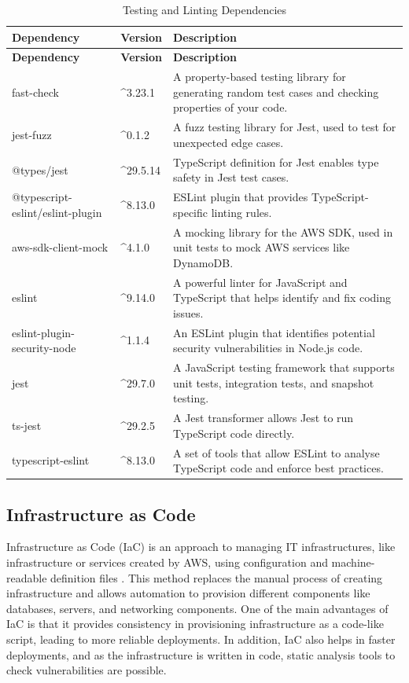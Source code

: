 \begin{longtable}{|l|l|p{8cm}|}
\caption{Testing and Linting Dependencies}
\label{table:lint_testing_dependencies}
\hline
\rowcolor{grey!15}
\textbf{Dependency} & \textbf{Version} & \textbf{Description} \\
\endfirsthead
\hline
\rowcolor{grey!15}
\textbf{Dependency} & \textbf{Version} & \textbf{Description} \\
\endhead
\endfoot
\hline
\endlastfoot
fast-check & \textasciicircum 3.23.1 & A property-based testing library for generating random test cases and checking properties of your code. \\
jest-fuzz & \textasciicircum 0.1.2 & A fuzz testing library for Jest, used to test for unexpected edge cases. \\
\hline
@types/jest & \textasciicircum 29.5.14 & TypeScript definition for Jest enables type safety in Jest test cases. \\
\hline
@typescript-eslint/eslint-plugin & \textasciicircum 8.13.0 & ESLint plugin that provides TypeScript-specific linting rules. \\
\hline
aws-sdk-client-mock & \textasciicircum 4.1.0 & A mocking library for the AWS SDK, used in unit tests to mock AWS services like DynamoDB. \\
\hline
eslint & \textasciicircum 9.14.0 & A powerful linter for JavaScript and TypeScript that helps identify and fix coding issues. \\
\hline
eslint-plugin-security-node & \textasciicircum 1.1.4 & An ESLint plugin that identifies potential security vulnerabilities in Node.js code. \\
\hline
jest & \textasciicircum 29.7.0 & A JavaScript testing framework that supports unit tests, integration tests, and snapshot testing. \\
\hline
ts-jest & \textasciicircum 29.2.5 & A Jest transformer allows Jest to run TypeScript code directly. \\
\hline
typescript-eslint & \textasciicircum 8.13.0 & A set of tools that allow ESLint to analyse TypeScript code and enforce best practices. \\
\hline
\end{longtable}

\subsection{Infrastructure as Code}
Infrastructure as Code (IaC) is an approach to managing IT infrastructures, like infrastructure or services created by AWS, using configuration and machine-readable definition files \citep{iac}. This method replaces the manual process of creating infrastructure and allows automation to provision different components like databases, servers, and networking components. One of the main advantages of IaC is that it provides consistency in provisioning infrastructure as a code-like script, leading to more reliable deployments. In addition, IaC also helps in faster deployments, and as the infrastructure is written in code, static analysis tools to check vulnerabilities are possible.

